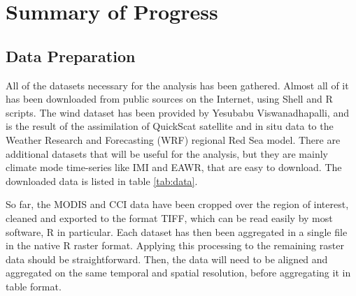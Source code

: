 \chapter{Summary of Progress}

\section{Data Preparation}

All of the datasets necessary for the analysis has been gathered. Almost all of
it has been downloaded from public sources on the Internet, using Shell and R
scripts.  The wind dataset has been provided by Yesubabu Viswanadhapalli, and
is the result of the assimilation of QuickScat satellite and in situ data to
the Weather Research and Forecasting (WRF) regional Red Sea model. There are
additional datasets that will be useful for the analysis, but they are mainly
climate mode time-series like IMI and EAWR, that are easy to download. The
downloaded data is listed in table \ref{tab:data}.

So far, the MODIS and CCI data have been cropped over the region of interest,
cleaned and exported to the format TIFF, which can be read easily by most
software, R in particular. Each dataset has then been aggregated in a single
file in the native R raster format. Applying this processing to the remaining
raster data should be straightforward. Then, the data will need to be aligned
and aggregated on the same temporal and spatial resolution, before aggregating
it in table format.

